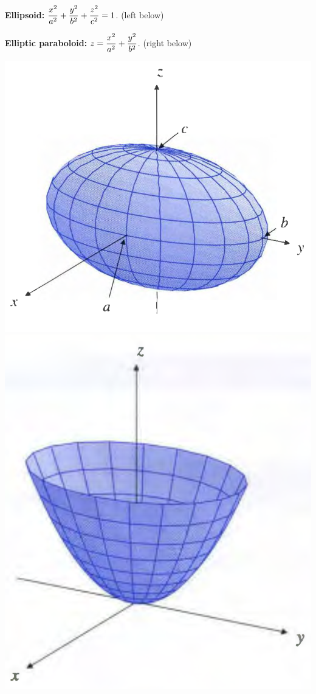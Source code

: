 \documentclass[11pt, a4paper]{MATH2023}
\begin{document}
\begin{spacing}{1.3}
    {\bf Ellipsoid:} $\displaystyle \frac{x^2}{a^2}+\frac{y^2}{b^2}+\frac{z^2}{c^2}=1$. (left below)

    {\bf Elliptic paraboloid:} $\displaystyle z=\frac{x^2}{a^2}+\frac{y^2}{b^2}$. (right below)

    \begin{center}
        \includegraphics[scale=0.3]{images/Ch10-ellipsoid.png}
        \hspace{1in}
        \includegraphics[scale=0.3]{images/Ch10-elliptic-paraboloid.png}
    \end{center}


\end{spacing}
\end{document}
